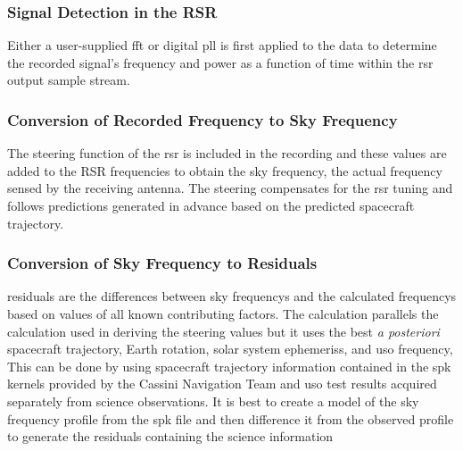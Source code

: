 \documentclass{article}
\theoremstyle{mystyle}
\begin{document}
\subsubsection{\footnotesize Signal Detection in the RSR}

Either a user-supplied \gls{fft} or digital \gls{pll} is first applied to the data to determine the recorded signal’s \gls{frequency} and \gls{power} as a function of time within the \gls{rsr} output sample stream. 

\subsubsection{\footnotesize Conversion of Recorded Frequency to Sky Frequency}

The \gls{steering function} of the \gls{rsr} is included in the recording and these values are added to the RSR frequencies to obtain the sky frequency, the actual \gls{frequency} sensed by the receiving antenna. The \gls{steering} compensates for the \gls{rsr} tuning and follows predictions generated in advance based on the predicted spacecraft \gls{trajectory}.

\subsubsection{\footnotesize Conversion of Sky Frequency to Residuals}

\Glspl{residual} are the differences between \glspl{sky frequency} and the calculated \glspl{frequency} based on values of all known contributing factors. The calculation parallels the calculation used in deriving the \gls{steering} values but it uses the best \textit{a posteriori} spacecraft \gls{trajectory}, Earth \gls{rotation}, solar system \glspl{ephemeris}, and \gls{uso} \gls{frequency}, This can be done by using spacecraft trajectory information contained in the \gls{spk} \glspl{kernel} provided by the Cassini Navigation Team and \gls{uso} test results acquired separately from science observations. It is best to create a model of the \gls{sky frequency} profile from the \gls{spk} file and then difference it from the observed profile to generate the residuals containing the science information
%
\end{document}
